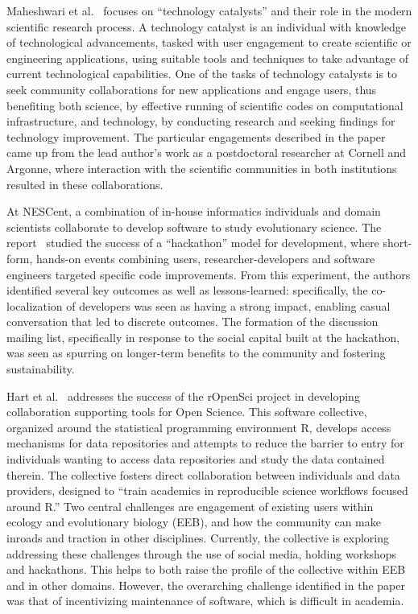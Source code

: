 \documentclass[11pt, oneside]{amsart}
\begin{document}
Maheshwari et al.~\cite{Maheshwari_WSSSPE} focuses on ``technology
catalysts'' and their role in the modern scientific research
process. A technology catalyst is an individual with knowledge of
technological advancements, tasked with user engagement to create
scientific or engineering applications, using suitable tools and
techniques to take advantage of current technological capabilities.
%
One of the tasks of technology catalysts is to seek community
collaborations for new applications and engage users, thus benefiting
both science, by effective running of scientific codes on
computational infrastructure, and technology, by conducting research
and seeking findings for technology improvement.  The particular
engagements described in the paper came up from the lead author's work
as a postdoctoral researcher at Cornell and Argonne, where interaction
with the scientific communities in both institutions resulted in these
collaborations.

At NESCent, a combination of in-house informatics individuals and
domain scientists collaborate to develop software to study
evolutionary science.  The report~\cite{Cranston_WSSSPE} studied the
success of a ``hackathon'' model for development, where short-form,
hands-on events combining users, researcher-developers and software
engineers targeted specific code improvements. From this experiment,
the authors identified several key outcomes as well as
lessons-learned: specifically, the co-localization of developers was
seen as having a strong impact, enabling casual conversation that led
to discrete outcomes.  The formation of the discussion mailing list,
specifically in response to the social capital built at the hackathon,
was seen as spurring on longer-term benefits to the community and
fostering sustainability.

Hart et al.~\cite{Hart_WSSSPE} addresses the success of the rOpenSci
project in developing collaboration supporting tools for
Open Science.  This software collective, organized around the
statistical programming environment R, develops access mechanisms for
data repositories and attempts to reduce the barrier to entry for
individuals wanting to access data repositories and study the data
contained therein.  The collective fosters direct collaboration
between individuals and data providers, designed to ``train academics
in reproducible science workflows focused around R.''  Two central
challenges are engagement of existing users within ecology and
evolutionary biology (EEB), and how the community can make inroads and
traction in other disciplines. Currently, the collective is exploring
addressing these challenges through the use of social media, holding
workshops and hackathons.  This helps to both raise the profile of
the collective within EEB and in other domains.  However, the
overarching challenge identified in the paper was that of
incentivizing maintenance of software, which is difficult in academia.
\end{document}
